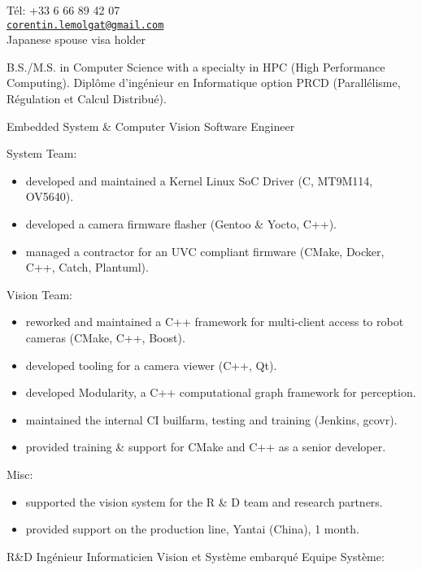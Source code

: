 \documentclass{article}
\begin{document}


T\'{e}l: +33 6 66 89 42 07\\
\href{mailto:corentin.lemolgat@gmail.com}{\texttt{corentin.lemolgat@gmail.com}}\\
Japanese spouse visa holder\\

\begin{llist}
 
 {
B.S./M.S. in Computer Science with a specialty in HPC (High Performance Computing).
} {
Dipl\^{o}me d'ing\'{e}nieur en Informatique option PRCD (Parall\'{e}lisme,
R\'{e}gulation et Calcul Distribu\'{e}).
}

{}
{}
\vspace{-0.33cm}

 {
Embedded System \& Computer Vision Software Engineer \\
\vspace{-0.33cm}

System Team:
\begin{itemize}
\item developed and maintained a Kernel Linux SoC Driver (C, MT9M114, OV5640).
\item developed a camera firmware flasher (Gentoo \& Yocto, C++).
\item managed a contractor for an UVC compliant firmware (CMake, Docker, C++, Catch, Plantuml).
\end{itemize}
Vision Team:
\begin{itemize}
\item reworked and maintained a C++ framework for multi-client access to robot cameras (CMake, C++, Boost).
\item developed tooling for a camera viewer (C++, Qt).
\item developed Modularity, a C++ computational graph framework for perception.
\item maintained the internal CI builfarm, testing and training (Jenkins,
 gcovr).
\item provided training \& support for CMake and C++ as a senior developer.
\end{itemize}
Misc:
\begin{itemize}
\item supported the vision system for the R \& D team and research partners.
\item provided support on the production line, Yantai (China), 1 month.
\end{itemize}
}{
R\&D Ing\'{e}nieur Informaticien Vision et Syst\`{e}me embarqu\'{e}
\vspace{-0.33cm}
Equipe Syst\`{e}me:

}
\end{llist}
\end{document}
